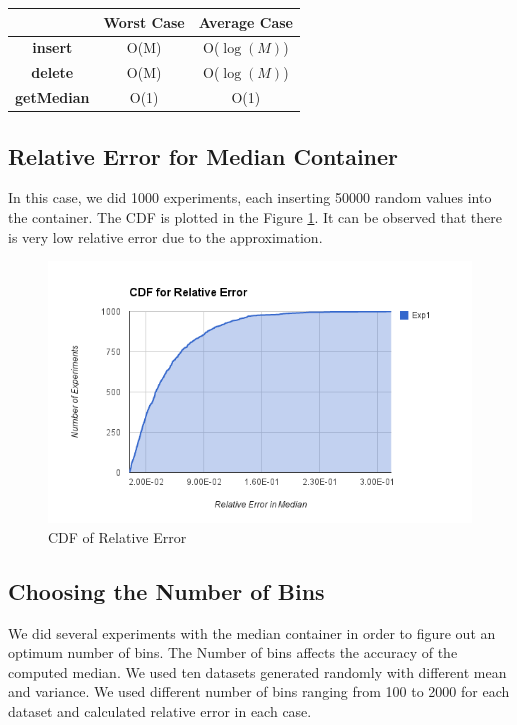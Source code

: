 \begin{table}[h]
\begin{center}
\begin{tabular}{|c|c|c|}
\hline 
 & \textbf{Worst Case} & \textbf{Average Case} \\ 
\hline 
\textbf{insert} & O(M) & O($\log(M)$) \\
\hline 
\textbf{delete} & O(M) & O($\log(M)$) \\
\hline 
\textbf{getMedian} & O(1) & O(1) \\ 
\hline 
\end{tabular} 
\end{center}
\end{table}

\subsection{Relative Error for Median Container}
In this case, we did 1000 experiments, each inserting 50000 random values into the container. The CDF is plotted in the Figure \ref{fig:relative_error}. It can be observed that there is very low relative error due to the approximation. 

\begin{figure}[h]
\begin{center}
\includegraphics[scale=0.5]{img/relative_error}
\caption{CDF of Relative Error \label{fig:relative_error}}
\end{center}
\end{figure}

\subsection{Choosing the Number of Bins}
We did several experiments with the median container in order to figure out an optimum number of bins. The Number of bins affects the accuracy of the computed median. We used ten datasets generated randomly with different mean and variance. We used different number of bins ranging from 100 to 2000 for each dataset and calculated relative error in each case.

